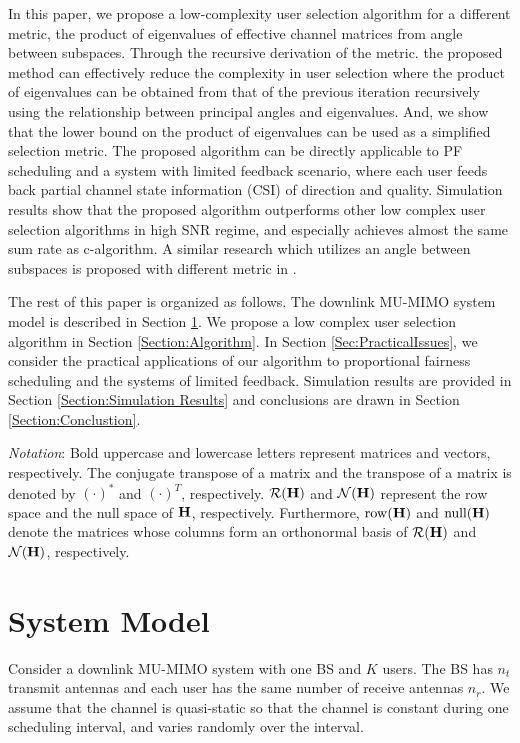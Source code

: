 \documentclass[journal,twoside]{IEEEtranTCOM}
\begin{document}
In this paper, we propose a low-complexity user selection algorithm for a different metric, the product of eigenvalues of effective channel matrices from angle between subspaces. Through the recursive derivation of the metric. the proposed method can effectively reduce the complexity in user selection where the product of eigenvalues can be obtained from that of the previous iteration recursively using the relationship between principal angles and eigenvalues.
And, we show that  the lower bound on the product of eigenvalues can be used as a simplified selection metric. The proposed algorithm can be directly applicable to PF scheduling and a system with limited feedback scenario, where each user feeds back partial channel state information (CSI)  of direction and quality. Simulation results show that the proposed algorithm outperforms other low complex user selection algorithms in high SNR regime, and especially achieves almost the same sum rate as c-algorithm.  A similar research which utilizes an angle between subspaces is proposed with different metric in \cite{Algo:Subspace}.


The rest of this paper is organized as follows. The  downlink MU-MIMO system model is described in Section \ref{Section:SystemModel}. We propose a low complex user selection algorithm in Section \ref{Section:Algorithm}. In Section \ref{Sec:PracticalIssues}, we consider the practical applications of our algorithm to  proportional fairness scheduling and the systems of limited feedback. Simulation results are provided in Section \ref{Section:Simulation Results} and conclusions are drawn in Section \ref{Section:Conclustion}.

\textit{Notation}: Bold uppercase and lowercase letters represent matrices and vectors, respectively. The conjugate transpose of a matrix and the transpose of a matrix is denoted by $(\cdot)^*$ and $(\cdot)^T$, respectively. $\cal{R}({\bf{H}})$ and $\cal{N}({\bf{H}})$ represent the row space and the null space of ${\bf{H}}$, respectively. Furthermore, $\mathrm{row}({\bf{H}})$ and $\mathrm{null}({\bf{H}})$ denote the matrices whose columns form an orthonormal basis of $\cal{R}({\bf{H}})$ and $\cal{N}({\bf{H}})$, respectively.

\section{System Model} \label{Section:SystemModel}
Consider a downlink MU-MIMO system with one BS and $K$ users. The BS has $n_t$ transmit antennas and each user has the same number of receive antennas $n_r$. We assume that the channel is quasi-static so that the channel is constant during one scheduling interval, and varies randomly over the interval.
\end{document}
